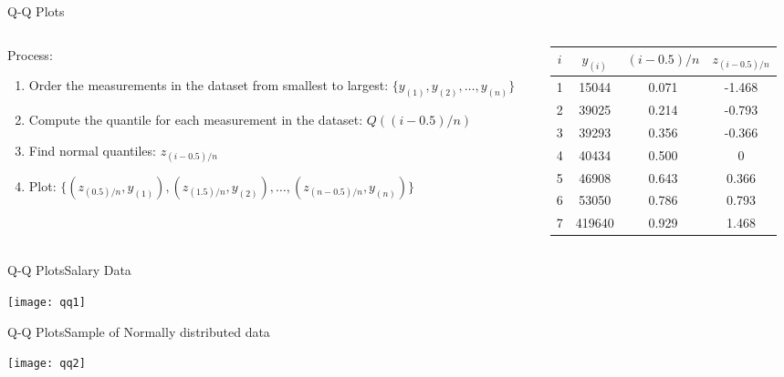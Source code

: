 \documentclass[xcolor=dvipsnames]{beamer}
\begin{document}
\begin{frame}{Q-Q Plots}
\begin{columns}
	\begin{column}{.45 \textwidth}
Process:
			\begin{enumerate}
				\item Order the measurements in the dataset from smallest to largest: $\{y_{(1)}, y_{(2)}, \hdots, y_{(n)} \}$
				\item Compute the quantile for each measurement in the dataset: $Q((i-0.5) /n)$
				\item Find normal quantiles: $z_{(i-0.5)/n}$
				\item Plot: $\{(z_{(0.5)/n}, y_{(1)}),(z_{(1.5)/n}, y_{(2)}),\hdots, (z_{(n-0.5)/n}, y_{(n)})\}$
			\end{enumerate}
	\end{column}
	\begin{column}{0.5 \textwidth}
		\vspace{-20pt}
		\begin{center}
			\begin{tabular}{|c|c|c|c|}
				\hline 
				$i$ & $y_{(i)}$ & $(i-0.5)/n$ & $z_{(i-0.5)/n}$ \\
				\hline \hline
				1 & 15044 & 0.071 & -1.468 \\ \hline
				2 & 39025 & 0.214 & -0.793 \\ \hline
				3 & 39293 & 0.356 & -0.366 \\ \hline
				4 & 40434 & 0.500 & 0 \\ \hline
				5 & 46908 & 0.643 & 0.366 \\ \hline
				6 & 53050 & 0.786 & 0.793 \\ \hline
				7 & 419640 & 0.929 & 1.468 \\ \hline
			\end{tabular}
		\end{center}
	\end{column}
\end{columns}

\end{frame}

\begin{frame}{Q-Q Plots}{Salary Data}
	\begin{center}
		\texttt{[image: qq1]}
	\end{center}
\end{frame}

\begin{frame}{Q-Q Plots}{Sample of Normally distributed data}
\begin{center}
	\texttt{[image: qq2]}
\end{center}
\end{frame}
\end{document}

